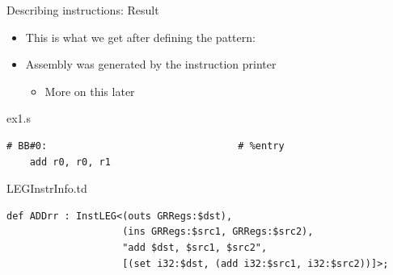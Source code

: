 \begin{frame}[fragile]{Describing instructions: Result}

\begin{itemize}
    \item This is what we get after defining the pattern:
    \item Assembly was generated by the instruction printer
    \begin{itemize}
        \item More on this later
    \end{itemize}
\end{itemize}

\begin{block}{ex1.s}
\begin{lstlisting}
# BB#0:                                 # %entry
	add r0, r0, r1
\end{lstlisting}
\end{block}

\begin{block}{LEGInstrInfo.td}
\begin{lstlisting}
def ADDrr : InstLEG<(outs GRRegs:$dst),
                    (ins GRRegs:$src1, GRRegs:$src2),
                    "add $dst, $src1, $src2",
                    [(set i32:$dst, (add i32:$src1, i32:$src2))]>;
\end{lstlisting}
\end{block}

\end{frame}


